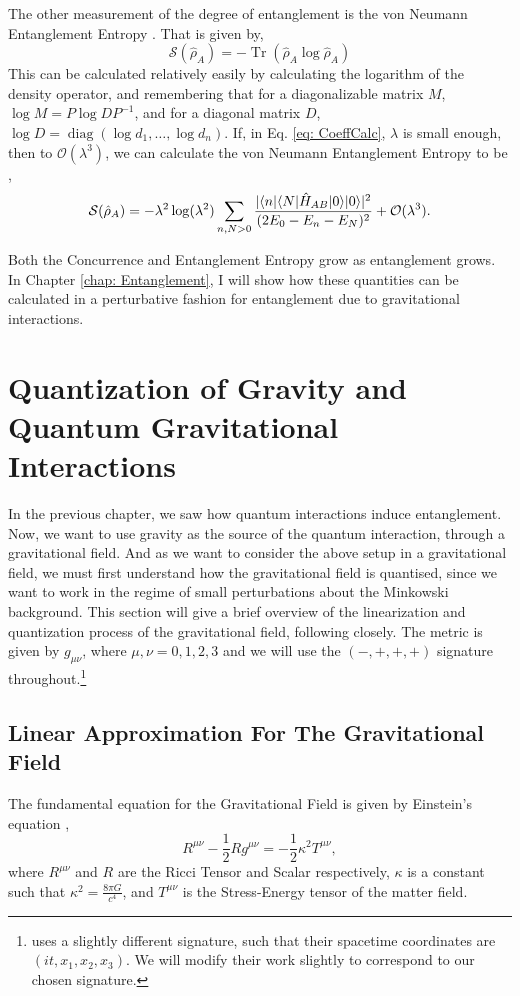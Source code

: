 \documentclass[12pt,a4paper]{report}
\theoremstyle{plain}
\theoremstyle{definition}
\theoremstyle{remark}
\newcommand{\munu}{\mu\nu}
\DeclarePairedDelimiter\bra{\langle}{\rvert}
\DeclarePairedDelimiter\ket{\lvert}{\rangle}
\DeclareMathOperator{\Tr}{Tr}
\DeclareMathOperator{\diag}{diag}
\begin{document}
The other measurement of the degree of entanglement is the von Neumann Entanglement Entropy \cite{Bala_2012, PhysRevA.101.052110, suddho}. That is given by,
\begin{equation}
    \mathcal{S}(\hat{\rho}_A) = -\Tr(\hat{\rho}_A \log{\hat{\rho}_A})
    \label{eq: Entropy}
\end{equation}
This can be calculated relatively easily by calculating the logarithm of the density operator, and remembering that for a diagonalizable matrix $M$, $\log{M} = P\log{D}P^{-1}$, and for a diagonal matrix $D$, $\log{D} = \diag(\log{d_1},\dots,\log{d_n})$.
If, in Eq. \ref{eq: CoeffCalc}, $\lambda$ is small enough, then to $\mathcal{O}(\lambda^3)$, we can calculate the von Neumann Entanglement Entropy to be \cite{Bala_2012},
\begin{equation}
    \mathcal{S}(\hat{\rho}_A) = -\lambda^2\log(\lambda^2)\sum_{n,N>0} \frac{|\bra{n}\bra{N}\hat{H}_{AB}\ket{0}\ket{0}|^2}{(2E_0 - E_n - E_N)^2} + \mathcal{O}(\lambda^3).
    \label{eq: Entropy2}
\end{equation}

Both the Concurrence and Entanglement Entropy grow as entanglement grows. In Chapter \ref{chap: Entanglement}, I will show how these quantities can be calculated in a perturbative fashion for entanglement due to gravitational interactions.

\newpage
\chapter{Quantization of Gravity and Quantum Gravitational Interactions}
In the previous chapter, we saw how quantum interactions induce entanglement. Now, we want to use gravity as the source of the quantum interaction, through a gravitational field. And as we want to consider the above setup in a gravitational field, we must first understand how the gravitational field is quantised, since we want to work in the regime of small perturbations about the Minkowski background. This section will give a brief overview of the linearization and quantization process of the gravitational field, following \citet{Gupta_1952} closely. The metric is given by $g_{\munu}$, where $\mu, \nu = 0, 1, 2, 3$ and we will use the $(-, +, +, +)$ signature throughout.\footnote{\citet{Gupta_1952} uses a slightly different signature, such that their spacetime coordinates are $(it, x_1, x_2, x_3)$. We will modify their work slightly to correspond to our chosen signature.}

\section{Linear Approximation For The Gravitational Field}
The fundamental equation for the Gravitational Field is given by Einstein's equation \cite{Gupta_1952, EinsteinGravWave},
\begin{equation}
    R^{\munu} - \frac{1}{2}Rg^{\munu} = -\frac{1}{2}\kappa^2T^{\munu},
    \label{eq: EinsteinEq}
\end{equation}
where $R^{\munu}$ and $R$ are the Ricci Tensor and Scalar respectively, $\kappa$ is a constant such that $\kappa^2 = \frac{8\pi G}{c^4}$, and $T^{\munu}$ is the Stress-Energy tensor of the matter field.
\end{document}
